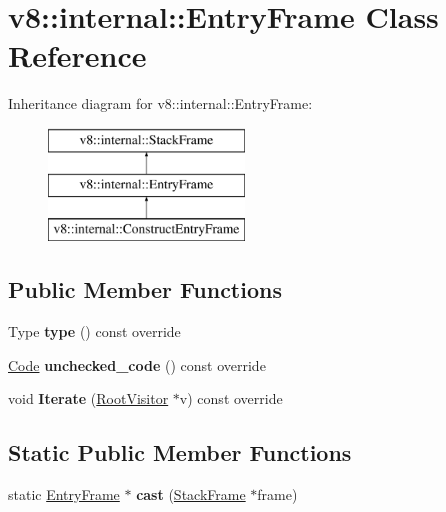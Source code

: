 \hypertarget{classv8_1_1internal_1_1EntryFrame}{}\section{v8\+:\+:internal\+:\+:Entry\+Frame Class Reference}
\label{classv8_1_1internal_1_1EntryFrame}
Inheritance diagram for v8\+:\+:internal\+:\+:Entry\+Frame\+:\begin{figure}[H]
\begin{center}
\leavevmode
\includegraphics[height=3.000000cm]{classv8_1_1internal_1_1EntryFrame}
\end{center}
\end{figure}
\subsection*{Public Member Functions}
\begin{DoxyCompactItemize}
\item 
\mbox{\label{classv8_1_1internal_1_1EntryFrame_a4c2dec7113cf50ef850a2a4a9cbf4bf8}} 
Type {\bfseries type} () const override
\item 
\mbox{\label{classv8_1_1internal_1_1EntryFrame_a42b79f257e39af252291228598d0eda4}} 
\mbox{\hyperlink{classv8_1_1internal_1_1Code}{Code}} {\bfseries unchecked\+\_\+code} () const override
\item 
\mbox{\label{classv8_1_1internal_1_1EntryFrame_ab7535eb80dba2605f8d1fb68af43087f}} 
void {\bfseries Iterate} (\mbox{\hyperlink{classv8_1_1internal_1_1RootVisitor}{Root\+Visitor}} $\ast$v) const override
\end{DoxyCompactItemize}
\subsection*{Static Public Member Functions}
\begin{DoxyCompactItemize}
\item 
\mbox{\label{classv8_1_1internal_1_1EntryFrame_a099b83b55ccf792d0c7a9efb9b58a688}} 
static \mbox{\hyperlink{classv8_1_1internal_1_1EntryFrame}{Entry\+Frame}} $\ast$ {\bfseries cast} (\mbox{\hyperlink{classv8_1_1internal_1_1StackFrame}{Stack\+Frame}} $\ast$frame)
\end{DoxyCompactItemize}

